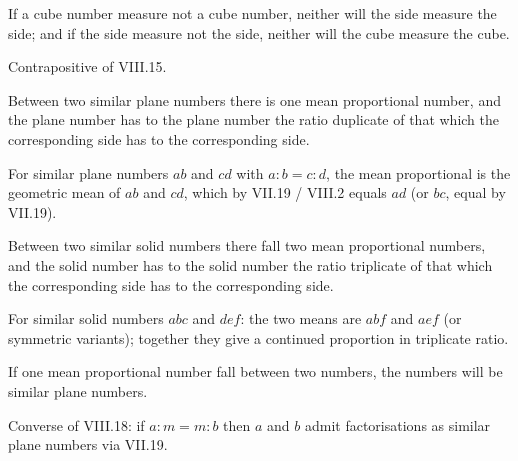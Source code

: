 \documentclass{rrxiv}
\begin{document}
\begin{claim}
\label{prop:VIII.17}
If a cube number measure not a cube number, neither will the side
measure the side; and if the side measure not the side, neither will
the cube measure the cube.
\end{claim}
\begin{evidence}
\label{ev:VIII.17}
Contrapositive of VIII.15.
\end{evidence}

\begin{claim}
\label{prop:VIII.18}
Between two similar plane numbers there is one mean proportional
number, and the plane number has to the plane number the ratio
duplicate of that which the corresponding side has to the
corresponding side.
\end{claim}
\begin{evidence}
\label{ev:VIII.18}
For similar plane numbers $ab$ and $cd$ with $a : b = c : d$, the
mean proportional is the geometric mean of $ab$ and $cd$, which by
VII.19 / VIII.2 equals $ad$ (or $bc$, equal by VII.19).
\end{evidence}

\begin{claim}
\label{prop:VIII.19}
Between two similar solid numbers there fall two mean proportional
numbers, and the solid number has to the solid number the ratio
triplicate of that which the corresponding side has to the
corresponding side.
\end{claim}
\begin{evidence}
\label{ev:VIII.19}
For similar solid numbers $abc$ and $def$: the two means are $abf$
and $aef$ (or symmetric variants); together they give a continued
proportion in triplicate ratio.
\end{evidence}

\begin{claim}
\label{prop:VIII.20}
If one mean proportional number fall between two numbers, the numbers
will be similar plane numbers.
\end{claim}
\begin{evidence}
\label{ev:VIII.20}
Converse of VIII.18: if $a : m = m : b$ then $a$ and $b$ admit
factorisations as similar plane numbers via VII.19.
\end{evidence}
\end{document}
